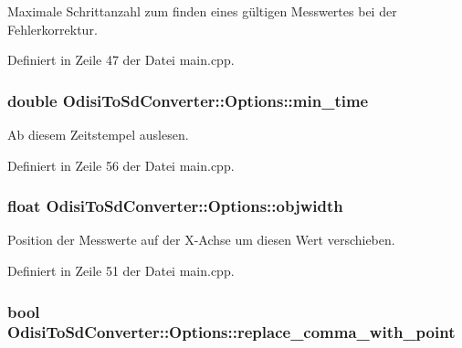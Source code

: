 Maximale Schrittanzahl zum finden eines gültigen Messwertes bei der Fehlerkorrektur. 



Definiert in Zeile 47 der Datei main.\-cpp.

\hypertarget{structOdisiToSdConverter_1_1Options_a2c97daa31cfdd315fd1d9a3307665edb}{
\subsubsection[{min\-\_\-time}]{\setlength{\rightskip}{0pt plus 5cm}double Odisi\-To\-Sd\-Converter\-::\-Options\-::min\-\_\-time}}\label{structOdisiToSdConverter_1_1Options_a2c97daa31cfdd315fd1d9a3307665edb}


Ab diesem Zeitstempel auslesen. 



Definiert in Zeile 56 der Datei main.\-cpp.

\hypertarget{structOdisiToSdConverter_1_1Options_a88d153166692e5bb6a4a37d453b2193c}{
\subsubsection[{objwidth}]{\setlength{\rightskip}{0pt plus 5cm}float Odisi\-To\-Sd\-Converter\-::\-Options\-::objwidth}}\label{structOdisiToSdConverter_1_1Options_a88d153166692e5bb6a4a37d453b2193c}


Position der Messwerte auf der X-\/\-Achse um diesen Wert verschieben. 



Definiert in Zeile 51 der Datei main.\-cpp.

\hypertarget{structOdisiToSdConverter_1_1Options_ad5adb03bbad593944fb94802f9efffe1}{
\subsubsection[{replace\-\_\-comma\-\_\-with\-\_\-point}]{\setlength{\rightskip}{0pt plus 5cm}bool Odisi\-To\-Sd\-Converter\-::\-Options\-::replace\-\_\-comma\-\_\-with\-\_\-point}}\label{structOdisiToSdConverter_1_1Options_ad5adb03bbad593944fb94802f9efffe1}


